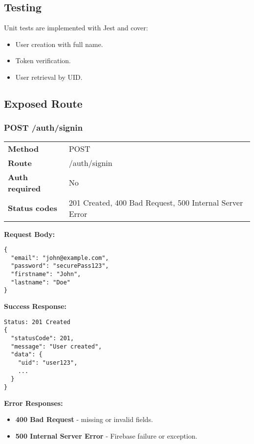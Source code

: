 \subsection*{Testing}

Unit tests are implemented with Jest and cover:
\begin{itemize}
    \item User creation with full name.
    \item Token verification.
    \item User retrieval by UID.
\end{itemize}

\subsection*{Exposed Route}

\subsubsection*{POST /auth/signin}

\begin{tabular}{>{\bfseries}l l}
\toprule
Method & POST \\
Route & /auth/signin \\
Auth required & No \\
Status codes & 201 Created, 400 Bad Request, 500 Internal Server Error \\
\bottomrule
\end{tabular}

\vspace{1em}
\textbf{Request Body:}
\begin{verbatim}
{
  "email": "john@example.com",
  "password": "securePass123",
  "firstname": "John",
  "lastname": "Doe"
}
\end{verbatim}

\vspace{1em}
\textbf{Success Response:}
\begin{verbatim}
Status: 201 Created
{
  "statusCode": 201,
  "message": "User created",
  "data": {
    "uid": "user123",
    ...
  }
}
\end{verbatim}

\vspace{1em}
\textbf{Error Responses:}
\begin{itemize}
    \item \textbf{400 Bad Request} - missing or invalid fields.
    \item \textbf{500 Internal Server Error} - Firebase failure or exception.
\end{itemize}
